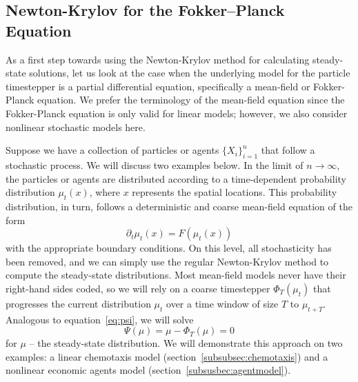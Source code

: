 \documentclass{article}
\begin{document}
\subsection{Newton-Krylov for the Fokker--Planck Equation}
As a first step towards using the Newton-Krylov method for calculating steady-state solutions, let us look at the case when the underlying model for the particle timestepper is a partial differential equation, specifically a mean-field or Fokker-Planck equation. We prefer the terminology of the mean-field equation since the Fokker-Planck equation is only valid for linear models; however, we also consider nonlinear stochastic models here.

Suppose we have a collection of particles or agents $\{X_i\}_{i=1}^n$ that follow a stochastic process. We will discuss two examples below. In the limit of $n \to \infty$, the particles or agents are distributed according to a time-dependent probability distribution $\mu_t(x)$, where $x$ represents the spatial locations. This probability distribution, in turn, follows a deterministic and coarse mean-field equation of the form
\begin{equation} \label{eq:mean-field}
    \partial_t \mu_t(x) = F(\mu_t(x))
\end{equation}
with the appropriate boundary conditions. On this level, all stochasticity has been removed, and we can simply use the regular Newton-Krylov method to compute the steady-state distributions. Most mean-field models never have their right-hand sides coded, so we will rely on a coarse timestepper $\Phi_T(\mu_t)$ that progresses the current distribution $\mu_t$ over a time window of size $T$ to $\mu_{t+T}$. Analogous to equation~\eqref{eq:psi}, we will solve
\begin{equation}
    \Psi(\mu) = \mu - \Phi_T(\mu) = 0
\end{equation}
for $\mu$ -- the steady-state distribution. We will demonstrate this approach on two examples: a linear chemotaxis model (section~\ref{subsubsec:chemotaxis}) and a nonlinear economic agents model (section~\ref{subsusbec:agentmodel}).
\end{document}
